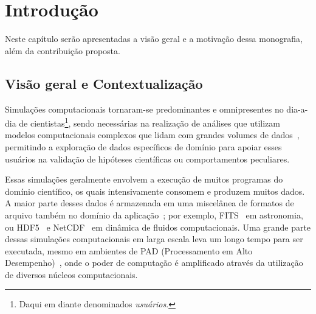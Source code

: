 
\chapter{Introdução}

Neste capítulo serão apresentadas a visão geral e a motivação dessa monografia, além da contribuição proposta.

\section{Visão geral e Contextualização}

Simulações computacionais tornaram-se predominantes e omnipresentes no dia-a-dia de cientistas\footnote{Daqui em diante denominados \textit{usuários}.}, sendo necessárias na realização de análises que utilizam modelos computacionais complexos que lidam com grandes volumes de dados~\cite{silva2015analyzing}, permitindo a exploração de dados específicos de domínio para apoiar esses usuários na validação de hipóteses científicas ou comportamentos peculiares.

Essas simulações geralmente envolvem a execução de muitos programas do domínio científico, os quais intensivamente consomem e produzem muitos dados. A maior parte desses dados é armazenada em uma miscelânea de formatos de arquivo também no domínio da aplicação~\cite{silva2015analyzing}; por exemplo,  FITS~\cite{greisen2002representations} em astronomia, ou  HDF5~\cite{folk1999hdf5} e  NetCDF~\cite{rew1990netcdf} em dinâmica de fluidos computacionais.
Uma grande parte dessas simulações computacionais em larga escala leva um longo tempo para ser executada, mesmo em ambientes de  PAD (Processamento em Alto Desempenho)~\cite{silva2017raw}, onde o poder de computação é amplificado através da utilização de diversos núcleos computacionais.

